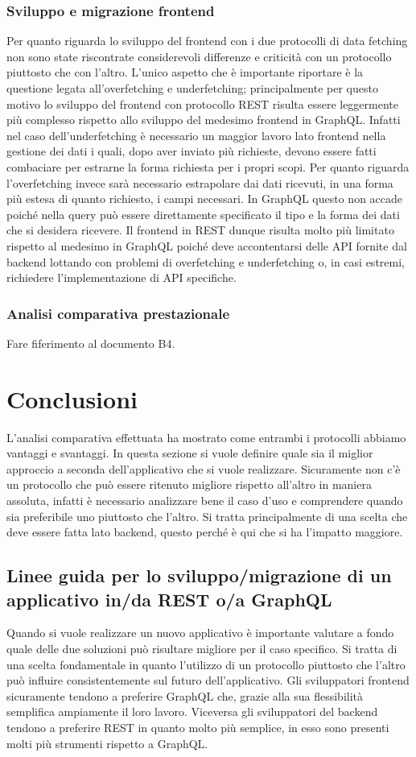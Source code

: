 \subsubsection*{Sviluppo e migrazione frontend}
Per quanto riguarda lo sviluppo del frontend con i due protocolli di data fetching non sono state riscontrate considerevoli differenze e criticità con un protocollo piuttosto che con l'altro. L'unico aspetto che è importante riportare è la questione legata all'overfetching e underfetching; principalmente per questo motivo lo sviluppo del frontend con protocollo REST risulta essere leggermente più complesso rispetto allo sviluppo del medesimo frontend in GraphQL. Infatti nel caso dell'underfetching è necessario un maggior lavoro lato frontend nella gestione dei dati i quali, dopo aver inviato più richieste, devono essere fatti combaciare per estrarne la forma richiesta per i propri scopi. Per quanto riguarda l'overfetching invece sarà necessario estrapolare dai dati ricevuti, in una forma più estesa di quanto richiesto, i campi necessari. In GraphQL questo non accade poiché nella query può essere direttamente specificato il tipo e la forma dei dati che si desidera ricevere. Il frontend in REST dunque risulta molto più limitato rispetto al medesimo in GraphQL poiché deve accontentarsi delle API fornite dal backend lottando con problemi di overfetching e underfetching o, in casi estremi, richiedere l'implementazione di API specifiche.
\subsubsection*{Analisi comparativa prestazionale}
Fare fiferimento al documento B4.
\section{Conclusioni}
L'analisi comparativa effettuata ha mostrato come entrambi i protocolli abbiamo vantaggi e svantaggi. In questa sezione si vuole definire quale sia il miglior approccio a seconda dell'applicativo che si vuole realizzare. Sicuramente non c'è un protocollo che può essere ritenuto migliore rispetto all'altro in maniera assoluta, infatti è necessario analizzare bene il caso d'uso e comprendere quando sia preferibile uno piuttosto che l'altro. Si tratta principalmente di una scelta che deve essere fatta lato backend, questo perché è qui che si ha l'impatto maggiore.
\subsection{Linee guida per lo sviluppo/migrazione di un applicativo in/da REST o/a GraphQL}
Quando si vuole realizzare un nuovo applicativo è importante valutare a fondo quale delle due soluzioni può risultare migliore per il caso specifico. Si tratta di una scelta fondamentale in quanto l'utilizzo di un protocollo piuttosto che l'altro può influire consistentemente sul futuro dell'applicativo. Gli sviluppatori frontend sicuramente tendono a preferire GraphQL che, grazie alla sua flessibilità semplifica ampiamente il loro lavoro. Viceversa gli sviluppatori del backend tendono a preferire REST in quanto molto più semplice, in esso sono presenti molti più strumenti rispetto a GraphQL.

